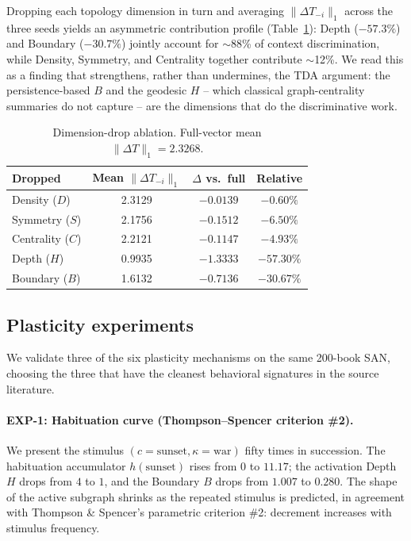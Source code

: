 \documentclass{article}
\begin{document}
Dropping each topology dimension in turn and averaging
$\|\Delta T_{-i}\|_1$ across the three seeds yields an asymmetric
contribution profile (Table~\ref{tab:ablation}): Depth ($-57.3\%$) and
Boundary ($-30.7\%$) jointly account for $\sim$88\% of context
discrimination, while Density, Symmetry, and Centrality together
contribute $\sim$12\%. We read this as a finding that strengthens, rather than undermines, the
TDA argument: the persistence-based $B$ and the geodesic $H$ -- which
classical graph-centrality summaries do not capture -- are the dimensions
that do the discriminative work.

\begin{table}[h]
\centering
\caption{Dimension-drop ablation. Full-vector mean
$\|\Delta T\|_1 = 2.3268$.}
\label{tab:ablation}
\begin{tabular}{lccc}
\toprule
Dropped & Mean $\|\Delta T_{-i}\|_1$ & $\Delta$ vs.\ full & Relative \\
\midrule
Density ($D$)    & 2.3129 & $-0.0139$ & $-0.60\%$ \\
Symmetry ($S$)   & 2.1756 & $-0.1512$ & $-6.50\%$ \\
Centrality ($C$) & 2.2121 & $-0.1147$ & $-4.93\%$ \\
Depth ($H$)      & 0.9935 & $-1.3333$ & $-57.30\%$ \\
Boundary ($B$)   & 1.6132 & $-0.7136$ & $-30.67\%$ \\
\bottomrule
\end{tabular}
\end{table}

\subsection{Plasticity experiments}
We validate three of the six plasticity mechanisms on the same
200-book SAN, choosing the three that have the cleanest behavioral
signatures in the source literature.

\paragraph{EXP-1: Habituation curve (Thompson--Spencer criterion \#2).}
We present the stimulus $(c = \text{sunset}, \kappa = \text{war})$ fifty
times in succession. The habituation accumulator
$h(\text{sunset})$ rises from $0$ to $11.17$; the activation Depth $H$
drops from $4$ to $1$, and the Boundary $B$ drops from $1.007$ to $0.280$.
The shape of the active subgraph shrinks as the repeated stimulus is
predicted, in agreement with Thompson \& Spencer's parametric criterion
\#2: decrement increases with stimulus frequency.
\end{document}
